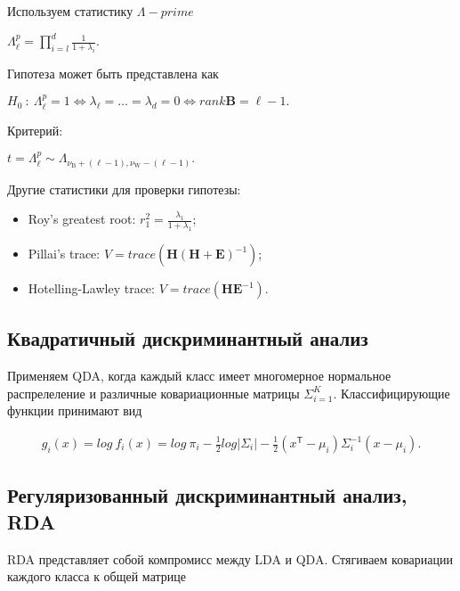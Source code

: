 \documentclass[12pt]{article}
\begin{document}
	Используем статистику $\Lambda - prime$ 
	
	\begin{center}
		$\Lambda_{\ell}^{p} = \prod_{i=l}^{d} \frac{1}{1+ \lambda_i}.$
	\end{center}

	Гипотеза может быть представлена как
	
	\begin{center}
	$H_{0}\ :\ \Lambda_{\ell}^{p}=1\Leftrightarrow\lambda_{\ell}=\ldots=\lambda_{d}=0\Leftrightarrow rank \textbf{B}=\ell-1.$
	\end{center}

	Критерий:
	
	\begin{center}
	$t=\Lambda_{\ell}^{p}\sim\Lambda_{\nu_{\mathrm{B}}+(\ell-1),\nu_{\mathrm{W}}-(\ell-1)}.$
	\end{center}

	Другие статистики для проверки гипотезы:
	
	\begin{itemize}
		\item Roy's greatest root: $r_{1}^{2}=\frac{\lambda_{1}}{1+\lambda_{1}}$;
		\item Pillai's trace: $V=trace(\textbf{H}(\textbf{H}+\textbf{E})^{-1})$;
		\item Hotelling-Lawley trace: $V=trace(\textbf{H}\textbf{E}^{-1})$. 
	\end{itemize}

	\subsection{Квадратичный дискриминантный анализ}
	
	Применяем QDA, когда каждый класс имеет многомерное нормальное распрелеление и различные ковариационные матрицы $\Sigma_{i=1}^K$. Классифицирующие функции принимают вид 
	
	\begin{eqnarray}\label{QDA}  
		g_i (x) = log \ f_i(x) = log \ \pi_i - \frac{1}{2} log \vert \Sigma_i \vert - \frac{1}{2} (x^\mathsf{T} - \mu_i) \Sigma_{i}^{-1} (x-\mu_i).
	\end{eqnarray}
	
	\subsection{Регуляризованный дискриминантный анализ, RDA}
	
	RDA представляет собой компромисс между LDA и QDA. Стягиваем ковариации каждого класса к общей матрице
	
\end{document}
